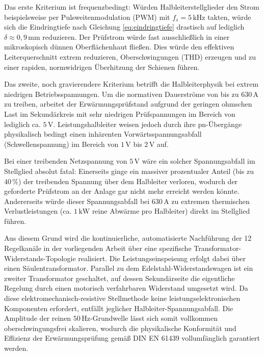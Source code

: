 Das erste Kriterium ist frequenzbedingt: Würden Halbleiterstellglieder den Strom beispielsweise per Pulsweitenmodulation (PWM) mit $f_s = 5\,\text{kHz}$ takten, würde sich die Eindringtiefe nach Gleichung \ref{eq:eindringtiefe} drastisch auf lediglich $\delta \approx 0,9\,\text{mm}$ reduzieren. Der Prüfstrom würde fast ausschließlich in einer mikroskopisch dünnen Oberflächenhaut fließen. Dies würde den effektiven Leiterquerschnitt extrem reduzieren, Oberschwingungen (THD) erzeugen und zu einer rapiden, normwidrigen Überhitzung der Schienen führen.

Das zweite, noch gravierendere Kriterium betrifft die Halbleiterphysik bei extrem niedrigen Betriebsspannungen. Um die normativen Dauerströme von bis zu $630\,\text{A}$ zu treiben, arbeitet der Erwärmungsprüfstand aufgrund der geringen ohmschen Last im Sekundärkreis mit sehr niedrigen Prüfspannungen im Bereich von lediglich ca. $5\,\text{V}$. Leistungshalbleiter weisen jedoch durch ihre pn-Übergänge physikalisch bedingt einen inhärenten Vorwärtsspannungsabfall (Schwellenspannung) im Bereich von $1\,\text{V}$ bis $2\,\text{V}$ auf. 

Bei einer treibenden Netzspannung von $5\,\text{V}$ wäre ein solcher Spannungsabfall im Stellglied absolut fatal: Einerseits ginge ein massiver prozentualer Anteil (bis zu $40\,\%$) der treibenden Spannung über dem Halbleiter verloren, wodurch der geforderte Prüfstrom an der Anlage gar nicht mehr erreicht werden könnte. Andererseits würde dieser Spannungsabfall bei $630\,\text{A}$ zu extremen thermischen Verlustleistungen (ca. $1\,\text{kW}$ reine Abwärme pro Halbleiter) direkt im Stellglied führen.

Aus diesem Grund wird die kontinuierliche, automatisierte Nachführung der 12 Regelkanäle in der vorliegenden Arbeit über eine spezifische Transformator-Widerstands-Topologie realisiert. Die Leistungseinspeisung erfolgt dabei über einen Säulentransformator. Parallel zu dem  Edelstahl-Widerstandswagen ist ein zweiter Transformator geschaltet, auf dessen Sekundärseite die eigentliche Regelung durch einen motorisch verfahrbaren Widerstand umgesetzt wird. Da diese elektromechanisch-resistive Stellmethode keine leistungselektronischen Komponenten erfordert, entfällt jeglicher Halbleiter-Spannungsabfall. Die Amplitude der reinen $50\,\text{Hz}$-Grundwelle lässt sich somit vollkommen oberschwingungsfrei skalieren, wodurch die physikalische Konformität und Effizienz der Erwärmungsprüfung gemäß DIN EN 61439 vollumfänglich garantiert werden.
